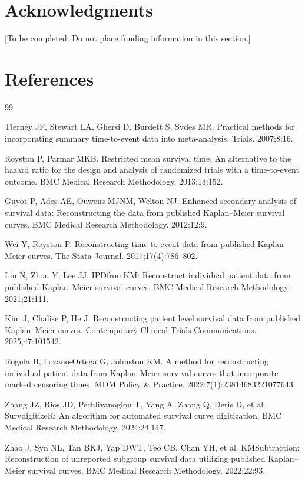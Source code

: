 \documentclass[12pt,letterpaper]{article}
\begin{document}
\section*{Acknowledgments}
[To be completed. Do not place funding information in this section.]

\section*{References}
\begin{thebibliography}{99}
\setlength{\itemsep}{0.45\baselineskip}
\setlength{\parskip}{0pt}

Tierney JF, Stewart LA, Ghersi D, Burdett S, Sydes MR. Practical methods for incorporating summary time-to-event data into meta-analysis. Trials. 2007;8:16.

Royston P, Parmar MKB. Restricted mean survival time: An alternative to the hazard ratio for the design and analysis of randomized trials with a time-to-event outcome. BMC Medical Research Methodology. 2013;13:152.

Guyot P, Ades AE, Ouwens MJNM, Welton NJ. Enhanced secondary analysis of survival data: Reconstructing the data from published Kaplan--Meier survival curves. BMC Medical Research Methodology. 2012;12:9.

Wei Y, Royston P. Reconstructing time-to-event data from published Kaplan--Meier curves. The Stata Journal. 2017;17(4):786--802.

Liu N, Zhou Y, Lee JJ. IPDfromKM: Reconstruct individual patient data from published Kaplan--Meier survival curves. BMC Medical Research Methodology. 2021;21:111.

Kim J, Chalise P, He J. Reconstructing patient level survival data from published Kaplan--Meier curves. Contemporary Clinical Trials Communications. 2025;47:101542.

Rogula B, Lozano-Ortega G, Johnston KM. A method for reconstructing individual patient data from Kaplan--Meier survival curves that incorporate marked censoring times. MDM Policy \& Practice. 2022;7(1):23814683221077643.

Zhang JZ, Rios JD, Pechlivanoglou T, Yang A, Zhang Q, Deris D, et al. SurvdigitizeR: An algorithm for automated survival curve digitization. BMC Medical Research Methodology. 2024;24:147.

Zhao J, Syn NL, Tan BKJ, Yap DWT, Teo CB, Chan YH, et al. KMSubtraction: Reconstruction of unreported subgroup survival data utilizing published Kaplan--Meier survival curves. BMC Medical Research Methodology. 2022;22:93.


\end{thebibliography}
\end{document}
